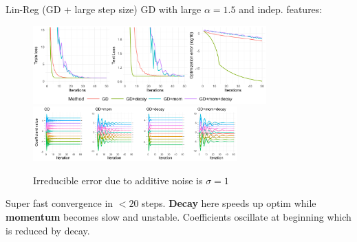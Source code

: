 \documentclass[11pt,compress,t,notes=noshow, xcolor=table]{beamer}
\begin{document}
\begin{vbframe}{Lin-Reg (GD + large step size)}
\vspace{-0.5cm}
GD with large $\alpha=1.5$ and indep. features:
\begin{figure}
            \includegraphics[width=0.8\textwidth]{slides/04-multivariate-first-order/figure_man/simu_linmod/GD_reg_large_lr_iters.pdf} \\
             \includegraphics[width=0.7\textwidth]{slides/04-multivariate-first-order/figure_man/simu_linmod/GD_reg_coef_large.pdf}\\
            \begin{footnotesize}
                Irreducible error due to additive noise is $\sigma=1$
            \end{footnotesize}
\end{figure}
Super fast convergence in $<20$ steps. \textbf{Decay} here speeds up optim while \textbf{momentum} becomes slow and unstable. Coefficients oscillate at beginning which is reduced by decay.
\end{vbframe}


\end{document}
